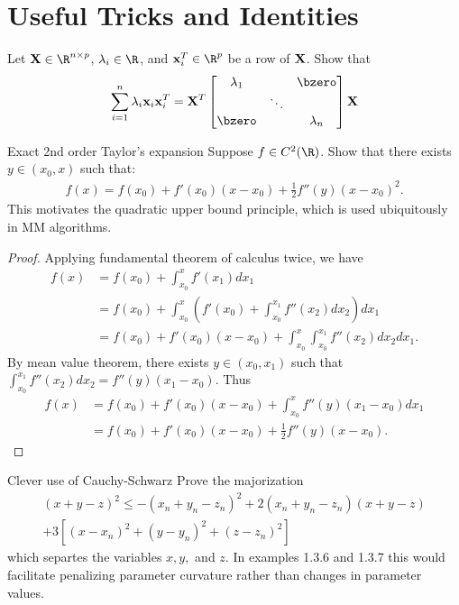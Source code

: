 \section{Useful Tricks and Identities}

\begin{problembox}{}{}
Let $\bX \in \R^{n \times p}$, $\lambda_i \in \R$, and $\bx_i^T \in \R^p$ be a row of $\mathbf{X}$. Show that
\begin{align*}
	\sum_{i=1}^n \lambda_i \bx_i\bx_i^T = \bX^T
	\begin{bmatrix}
		\lambda_1 & & \bzero \\
		& \ddots & \\
		\bzero & & \lambda_n
	\end{bmatrix} \bX
\end{align*}
\end{problembox}

\begin{problembox}{Exact 2nd order Taylor's expansion}{}
Suppose $f \in C^{2}(\R)$. Show that there exists $y \in (x_0, x)$ such that:
\begin{align*}
f(x) = f(x_0) + f'(x_0)(x - x_0) + \frac{1}{2} f''(y)(x - x_0)^2.
\end{align*}
This motivates the quadratic upper bound principle, which is used ubiquitously in MM algorithms.
\end{problembox}

\begin{proof}
Applying fundamental theorem of calculus twice, we have
\begin{align*}
	f(x) 
	&= f(x_0) + \int_{x_0}^x f'(x_1) dx_1\\
	&=f(x_0) + \int_{x_0}^x \left(f'(x_0) + \int_{x_0}^{x_1} f''(x_2)dx_2 \right)dx_1\\
	&= f(x_0) + f'(x_0)(x - x_0) + \int_{x_0}^x\int_{x_0}^{x_1}f''(x_2)dx_2dx_1.
\end{align*}
By mean value theorem, there exists $y \in (x_0, x_1)$ such that $\int_{x_0}^{x_1}f''(x_2)dx_2 = f''(y)(x_1 - x_0).$ Thus
\begin{align*}
	f(x)
	&= f(x_0) + f'(x_0)(x - x_0) +\int_{x_0}^x f''(y)(x_1 - x_0)dx_1\\
	&= f(x_0) + f'(x_0)(x - x_0) + \frac{1}{2}f''(y)(x - x_0).
\end{align*}
\end{proof}

\begin{problembox}{Clever use of Cauchy-Schwarz \hfill {\small \cite[Exercise 1.4.18]{lange2016mm}}}{}
Prove the majorization
\begin{equation*}
\begin{split}
(x + y - z)^2 \leq -(x_n + y_n - z_n)^2 + 2(x_n + y_n-z_n)(x+y-z) \\
+ 3[(x-x_n)^2 + (y-y_n)^2 + (z-z_n)^2]
\end{split}
\end{equation*}
which separtes the variables $x, y, $ and $z$. In examples 1.3.6 and 1.3.7 this would facilitate penalizing parameter curvature rather than changes in parameter values. 
\end{problembox}

